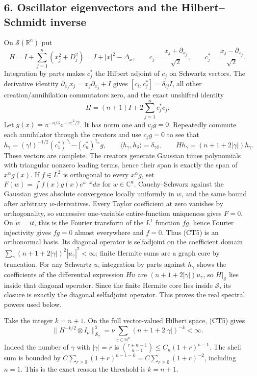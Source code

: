 \documentclass[
  11pt,
]{article}
\begin{document}
\subsection{6. Oscillator eigenvectors and the Hilbert--Schmidt
inverse}\label{oscillator-eigenvectors-and-the-hilbertschmidt-inverse}

On \(\mathcal S(\mathbb R^n)\) put \[
 H=I+\sum_{j=1}^n(x_j^2+D_j^2)
   =I+|x|^2-\Delta_x,\qquad
 c_j=\frac{x_j+\partial_{x_j}}{\sqrt2},\qquad
 c_j^*=\frac{x_j-\partial_{x_j}}{\sqrt2}.
 \tag{CT3}
\] Integration by parts makes \(c_j^*\) the Hilbert adjoint of \(c_j\)
on Schwartz vectors. The derivative identity
\(\partial_{x_j}x_j=x_j\partial_{x_j}+I\) gives
\([c_i,c_j^*]=\delta_{ij}I\), all other creation/annihilation
commutators zero, and the exact unshifted identity \[
 H=(n+1)I+2\sum_{j=1}^n c_j^*c_j.
 \tag{CT4}
\] Let \(g(x)=\pi^{-n/4}e^{-|x|^2/2}\). It has norm one and \(c_jg=0\).
Repeatedly commute each annihilator through the creators and use
\(c_jg=0\) to see that \[
 h_\gamma=(\gamma!)^{-1/2}
       (c_1^*)^{\gamma_1}\cdots(c_n^*)^{\gamma_n}g,
 \qquad
 \langle h_\gamma,h_\delta\rangle=\delta_{\gamma\delta},
 \qquad
 Hh_\gamma=(n+1+2|\gamma|)h_\gamma.
 \tag{CT5}
\] These vectors are complete. The creators generate Gaussian times
polynomials with triangular nonzero leading terms, hence their span is
exactly the span of \(x^\alpha g(x)\). If \(f\in L^2\) is orthogonal to
every \(x^\alpha g\), set \(F(w)=\int f(x)g(x)e^{w\cdot x}dx\) for
\(w\in\mathbb C^n\). Cauchy--Schwarz against the Gaussian gives absolute
convergence locally uniformly in \(w\), and the same bound after
arbitrary \(w\)-derivatives. Every Taylor coefficient at zero vanishes
by orthogonality, so successive one-variable entire-function uniqueness
gives \(F=0\). On \(w=it\), this is the Fourier transform of the \(L^1\)
function \(fg\), hence Fourier injectivity gives \(fg=0\) almost
everywhere and \(f=0\). Thus (CT5) is an orthonormal basis. Its diagonal
operator is selfadjoint on the coefficient domain
\(\sum_\gamma(n+1+2|\gamma|)^2|u_\gamma|^2<\infty\); finite Hermite sums
are a graph core by truncation. For any Schwartz \(u\), integration by
parts against \(h_\gamma\) shows the coefficients of the differential
expression \(Hu\) are \((n+1+2|\gamma|)u_\gamma\), so
\(H|_{\mathcal S}\) lies inside that diagonal operator. Since the finite
Hermite core lies inside \(\mathcal S\), its closure is exactly the
diagonal selfadjoint operator. This proves the real spectral powers used
below.

Take the integer \(k=n+1\). On the full vector-valued Hilbert space,
(CT5) gives \[
 \|H^{-k/2}\otimes I_\nu\|_{\mathcal S_2}^2
 =\nu\sum_{\gamma\in\mathbb N^n}(n+1+2|\gamma|)^{-k}
 <\infty.
 \tag{CT6}
\] Indeed the number of \(\gamma\) with \(|\gamma|=r\) is
\(\binom{r+n-1}{n-1}\le C_n(1+r)^{n-1}\). The shell sum is bounded by
\(C\sum_{r\ge0}(1+r)^{n-1-k}=C\sum_{r\ge0}(1+r)^{-2}\), including
\(n=1\). This is the exact reason the threshold is \(k=n+1\).
\end{document}
